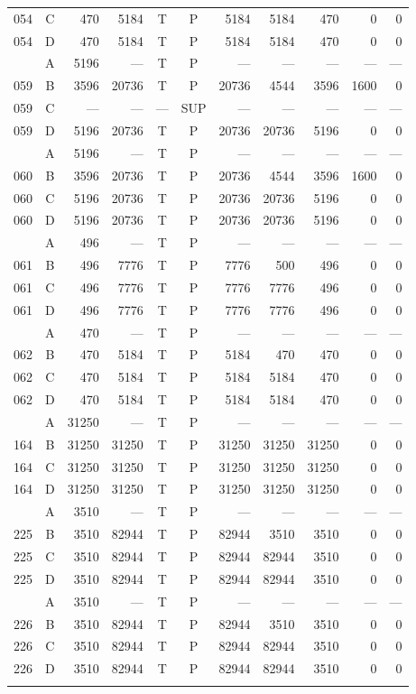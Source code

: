 \begin{longtable}{@{}rcrrccrrrrr@{}}
054 & C & 470 & 5184 & T & P & 5184 & 5184 & 470 & 0 & 0 \\
054 & D & 470 & 5184 & T & P & 5184 & 5184 & 470 & 0 & 0 \\
\addlinespace[2pt]
059 & A & 5196 & --- & T & P & --- & --- & --- & --- & --- \\
059 & B & 3596 & 20736 & T & P & 20736 & 4544 & 3596 & 1600 & 0 \\
059 & C & --- & --- & --- & SUP & --- & --- & --- & --- & --- \\
059 & D & 5196 & 20736 & T & P & 20736 & 20736 & 5196 & 0 & 0 \\
\addlinespace[2pt]
060 & A & 5196 & --- & T & P & --- & --- & --- & --- & --- \\
060 & B & 3596 & 20736 & T & P & 20736 & 4544 & 3596 & 1600 & 0 \\
060 & C & 5196 & 20736 & T & P & 20736 & 20736 & 5196 & 0 & 0 \\
060 & D & 5196 & 20736 & T & P & 20736 & 20736 & 5196 & 0 & 0 \\
\addlinespace[2pt]
061 & A & 496 & --- & T & P & --- & --- & --- & --- & --- \\
061 & B & 496 & 7776 & T & P & 7776 & 500 & 496 & 0 & 0 \\
061 & C & 496 & 7776 & T & P & 7776 & 7776 & 496 & 0 & 0 \\
061 & D & 496 & 7776 & T & P & 7776 & 7776 & 496 & 0 & 0 \\
\addlinespace[2pt]
062 & A & 470 & --- & T & P & --- & --- & --- & --- & --- \\
062 & B & 470 & 5184 & T & P & 5184 & 470 & 470 & 0 & 0 \\
062 & C & 470 & 5184 & T & P & 5184 & 5184 & 470 & 0 & 0 \\
062 & D & 470 & 5184 & T & P & 5184 & 5184 & 470 & 0 & 0 \\
\addlinespace[2pt]
164 & A & 31250 & --- & T & P & --- & --- & --- & --- & --- \\
164 & B & 31250 & 31250 & T & P & 31250 & 31250 & 31250 & 0 & 0 \\
164 & C & 31250 & 31250 & T & P & 31250 & 31250 & 31250 & 0 & 0 \\
164 & D & 31250 & 31250 & T & P & 31250 & 31250 & 31250 & 0 & 0 \\
\addlinespace[2pt]
225 & A & 3510 & --- & T & P & --- & --- & --- & --- & --- \\
225 & B & 3510 & 82944 & T & P & 82944 & 3510 & 3510 & 0 & 0 \\
225 & C & 3510 & 82944 & T & P & 82944 & 82944 & 3510 & 0 & 0 \\
225 & D & 3510 & 82944 & T & P & 82944 & 82944 & 3510 & 0 & 0 \\
\addlinespace[2pt]
226 & A & 3510 & --- & T & P & --- & --- & --- & --- & --- \\
226 & B & 3510 & 82944 & T & P & 82944 & 3510 & 3510 & 0 & 0 \\
226 & C & 3510 & 82944 & T & P & 82944 & 82944 & 3510 & 0 & 0 \\
226 & D & 3510 & 82944 & T & P & 82944 & 82944 & 3510 & 0 & 0 \\
\addlinespace[2pt]
\bottomrule
\end{longtable}
